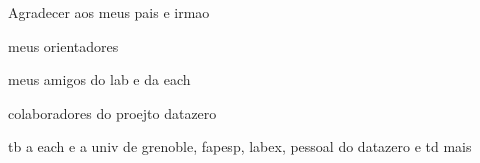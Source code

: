 
Agradecer aos meus pais e irmao

meus orientadores

meus amigos do lab e da each

colaboradores do proejto datazero

tb a each e a univ de grenoble, fapesp, labex, pessoal do datazero e td mais



